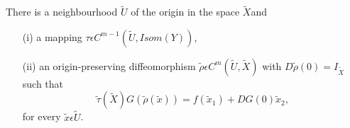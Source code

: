 \begin{theorem}\label{chap3-thm1.1}
There is a neighbourhood $\widetilde{U}$ of the origin in the space
$\widetilde{X}$\pageoriginale and
\begin{enumerate}
\item[(i)] a mapping $\tau \epsilon C^{m-1} (\widetilde{U}, Isom
  (Y))$,

\item[(ii)] an origin-preserving diffeomorphism $\widetilde{\rho}
  \epsilon C^{m} (\widetilde{U}, \widetilde{X})$ with
  $D\widetilde{\rho}(0) = I_{\widetilde{X}}$ such that
\begin{equation*}
\widetilde{\tau}(\widetilde{X}) G(\widetilde{\rho}(\widetilde{x})) =
f(\widetilde{x}_{1}) + DG(0) \widetilde{x}_{2},\tag{1.7}\label{chap3-eq1.7}
\end{equation*}
for every $\widetilde{x} \epsilon \widetilde{U}$.
\end{enumerate}
\end{theorem}

